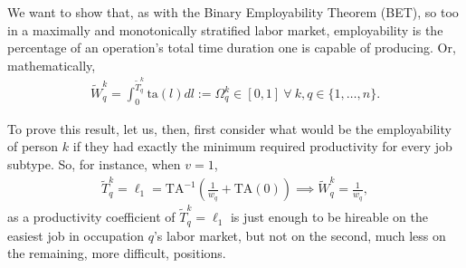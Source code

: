 \documentclass[hidelinks, nonatbib]{elsarticle}
\begin{document}
    We want to show that, as with the Binary Employability Theorem (BET), so too in a maximally and monotonically stratified labor market, employability is the percentage of an operation's total time duration one is capable of producing. Or, mathematically,
    \begin{gather}
        \tilde{W}_{q}^{k}
        =
        \int_{0}^{\tilde{T}_{q}^{k}}
        \text{ta}(l)
        dl
        :=
        \Omega_{q}^{k}
        \in 
        [0,1]
        \
        \forall
        \
        k,q \in \{1, \dots, n\}
        .
    \end{gather}

    To prove this result, let us, then, first consider what would be the employability of person $k$ if they had exactly the minimum required productivity for every job subtype. So, for instance, when $v = 1$,
    \begin{align}
        \tilde{T}_{q}^{k}
        =
        \ell_1
        =
        \text{TA}^{-1}
        \left(
            \frac{1}{w_q}
            +
            \text{TA}(0)
        \right)
        \implies
        \tilde{W}_{q}^{k}
        =
        \frac{1}{w_q}
        ,
    \end{align}
    as a productivity coefficient of $\tilde{T}_{q}^{k} = \ell_1$ is just enough to be hireable on the easiest job in occupation $q$'s labor market, but not on the second, much less on the remaining, more difficult, positions.
    
\end{document}
